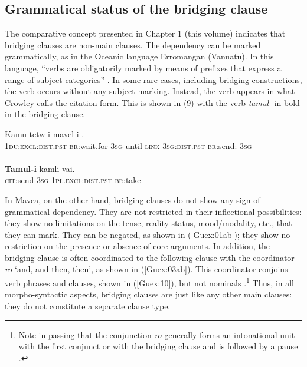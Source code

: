 \documentclass[output=paper]{LSP/langsci}
\begin{document}
\subsection{Grammatical status of the bridging clause} 
\label{Gusec:Status}
The comparative concept presented in Chapter 1 (this volume) indicates that bridging clauses are non-main clauses. The dependency can be marked grammatically, as in the Oceanic language Erromangan (Vanuatu). In this language, ``verbs are obligatorily marked by means of prefixes that express a range of subject categories'' \citep[][85]{crowley98}. In some rare cases, including bridging constructions, the verb occurs without any subject marking. Instead, the verb appears in what Crowley calls the citation form. This is shown in (9) with the verb \textit{tamul-} in bold in the bridging clause. 

\begin{exe}
	\ex	\label{Guex:9ab}
	\begin{xlist}
\ex	\label{Guex:9a}
		\gll	 Kamu-tetw-i   mavel-i \underline{}.\\
			\textsc{1du:excl:dist.pst-br}:wait.for-\textsc{3sg} 	until-\textsc{link} \textsc{3sg:dist.pst-br}:send:-\textsc{3sg}\\
		\glt	{}\\
\ex	\label{Guex:9b}
		\gll	\textbf{Tamul-i} kamli-vai.\\
			\textsc{cit}:send-\textsc{3sg} \textsc{1pl.excl:dist.pst-br}:take \\
		\glt	{} \citep [][118]{crowley98}
	\end{xlist}
\end{exe}

In Mavea, on the other hand, bridging clauses do not show any sign of grammatical dependency. They are not restricted in their inflectional possibilities: they show no limitations on the tense, reality status, mood/modality, etc., that they can mark. They can be negated, as shown in (\ref{Guex:01ab}); they show no restriction on the presence or absence of core arguments. In addition, the bridging clause is often coordinated to the following clause with the coordinator \textit{ro} `and, and then, then', as shown in (\ref{Guex:03ab}). This coordinator conjoins verb phrases and clauses, shown in (\ref{Guex:10}), but not nominals \citep[][314ff]{guerin11}.\footnote{Note in passing that the conjunction \textit{ro} generally forms an intonational unit with the first conjunct or with the bridging clause and is followed by a pause \citep[][321]{guerin11}.} Thus, in all morpho-syntactic aspects, bridging clauses are just like any other main clauses: they do not constitute a separate clause type.  
\end{document}
